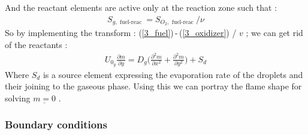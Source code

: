 \documentclass[12pt]{article}
\numberwithin{equation}{section}
\begin{document}
\begin{flushleft}
And the reactant elements are active only at the reaction zone such that :
\begin{align} 
S_{g, \text { fuel-reac }}=S_{O_{2}, \text{ fuel-reac }} / \nu
\end{align}
So by implementing the transform : (\ref{3_fuel})\,-\,(\ref{3_oxidizer}) / $v$ ; we can get rid of the reactants :
\begin{align}
U_{0_g} \frac{\partial m}{\partial y}=D_{g} \Big( \frac{\partial^{2} m}{\partial x^{2}}+\frac{\partial^{2} m}{\partial y^{2}} \Big)+S_{d}
\end{align}
Where $S_{d}$ is a source element expressing the evaporation rate of the droplets and their
joining to the gaseous phase. Using this we can portray the flame shape for solving $\underline{m=0}$ .
\newpage


\subsubsection{Boundary conditions}


\end{flushleft}
\end{document}
